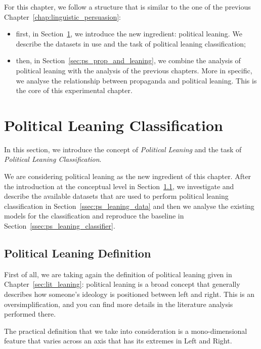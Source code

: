 For this chapter, we follow a structure that is similar to the one of the previous Chapter~\ref{chap:linguistic_persuasion}:
\begin{itemize}
    \item first, in Section~\ref{sec:ps_political_sides}, we introduce the new ingredient: political leaning. We describe the datasets in use and the task of political leaning classification;
    \item then, in Section~\ref{sec:ps_prop_and_leaning}, we combine the analysis of political leaning with the analysis of the previous chapters. More in specific, we analyse the relationship between propaganda and political leaning. This is the core of this experimental chapter.
\end{itemize}


\section{\statusgreen Political Leaning Classification}
\label{sec:ps_political_sides}

In this section, we introduce the concept of \emph{Political Leaning} and the task of \emph{Political Leaning Classification}.

We are considering political leaning as the new ingredient of this chapter. After the introduction at the conceptual level in Section~\ref{ssec:ps_leaning_def}, we investigate and describe the available datasets that are used to perform political leaning classification in Section~\ref{ssec:ps_leaning_data} and then we analyse the existing models for the classification and reproduce the baseline in Section~\ref{ssec:ps_leaning_classifier}.


\subsection{\statusgreen Political Leaning Definition}
\label{ssec:ps_leaning_def}

First of all, we are taking again the definition of political leaning given in Chapter~\ref{sec:lit_leaning}: political leaning is a broad concept that generally describes how someone's ideology is positioned between left and right. This is an oversimplification, and you can find more details in the literature analysis performed there.

The practical definition that we take into consideration is a mono-dimensional feature that varies across an axis that has its extremes in Left and Right.

